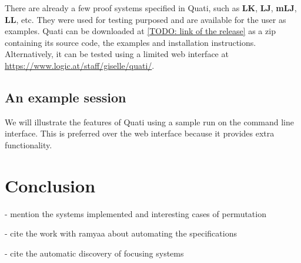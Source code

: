 \documentclass{llncs}
\begin{document}
%
There are already a few proof systems specified in Quati, such as \textbf{LK},
\textbf{LJ}, \textbf{mLJ}, \textbf{LL}, etc. They were used for testing purposed
and are available for the user as examples. Quati can be downloaded at
\url{[TODO: link of the release]} as a zip containing its source code, the
examples and installation instructions. Alternatively, it can be tested using a
limited web interface at \url{https://www.logic.at/staff/giselle/quati/}.

\subsection{An example session}

We will illustrate the features of Quati using a sample run on the command line
interface. This is preferred over the web interface because it provides extra
functionality.


\section{Conclusion}
\label{sec:conclusion}

- mention the systems implemented and interesting cases of permutation

- cite the work with ramyaa about automating the specifications

- cite the automatic discovery of focusing systems
\end{document}
